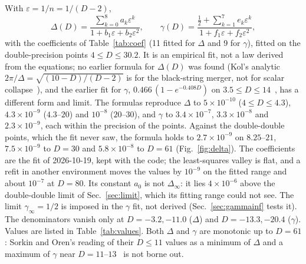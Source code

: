 \documentclass[aps,prd,onecolumn,superscriptaddress,nofootinbib,10pt]{revtex4-2}
\newcommand{\Dinf}{\Delta_\infty}
\newcommand{\eps}{\varepsilon}
\begin{document}
With $\eps = 1/n = 1/(D-2)$,
\begin{equation}
\Delta(D) = \frac{\sum_{k=0}^{8} a_k \eps^k}{1 + b_1\eps + b_2\eps^2}, \qquad
\gamma(D) = \frac{\tfrac12 + \sum_{k=1}^{7} e_k \eps^k}{1 + f_1\eps + f_2\eps^2},
\label{eq:formula}
\end{equation}
with the coefficients of Table~\ref{tab:coef} (11 fitted for $\Delta$ and 9 for $\gamma$), fitted on the
double-precision points $4 \le D \le 30.2$. It is an empirical fit, not a law derived from the equations; no earlier
formula for $\Delta(D)$ was found (Kol's analytic $2\pi/\Delta = \sqrt{(10-D)/(D-2)}$ is for the black-string merger, not
for scalar collapse~\cite{Kol2006}), and the earlier fit for $\gamma$, $0.466\,(1 - e^{-0.408D})$ on
$3.5 \le D \le 14$~\cite{BlandEtAl2005}, has a different form and limit. The formulas reproduce $\Delta$ to
$5\times10^{-10}$ ($4 \le D \le 4.3$), $4.3\times10^{-9}$ ($4.3$--$20$) and $10^{-8}$
($20$--$30$), and $\gamma$ to $3.4\times10^{-7}$, $3.3\times10^{-8}$ and $2.3\times10^{-9}$, each within the precision
of the points. Against the double-double points, which the fit never saw, the formula holds to $2.7\times10^{-9}$ on
$8.25$--$21$, $7.5\times10^{-9}$ to $D = 30$ and $5.8\times10^{-8}$ to $D = 61$ (Fig.~\ref{fig:delta}). The
coefficients are the fit of 2026-10-19, kept with the code; the least-squares valley is flat, and a refit in another
environment moves the values by $10^{-9}$ on the fitted range and about $10^{-7}$ at $D = 80$. Its constant
$a_0$ is not $\Dinf$: it lies $4\times10^{-6}$ above the double-double limit of Sec.~\ref{sec:limit}, which its fitting
range could not see. The limit $\gamma_\infty = 1/2$ is imposed in the $\gamma$ fit, not derived (Sec.~\ref{sec:gammainf}
tests it). The denominators vanish only at $D = -3.2, -11.0$ ($\Delta$) and $D = -13.3, -20.4$ ($\gamma$). Values are
listed in Table~\ref{tab:values}. Both $\Delta$ and $\gamma$ are monotonic up to $D = 61$: Sorkin and Oren's reading of
their $D \le 11$ values as a minimum of $\Delta$ and a maximum of $\gamma$ near $D = 11$--$13$~\cite{SorkinOren2005} is
not borne out.
\end{document}
